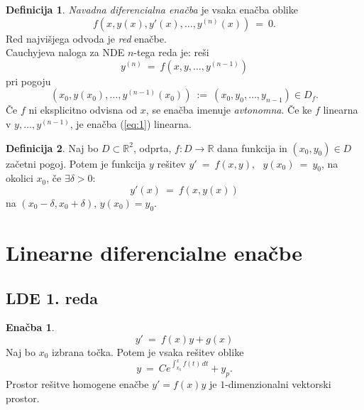 \documentclass[11pt]{article}
\newcommand{\R}{\mathbb{R}}
\newcommand{\0}{\mathbf{0}}
\theoremstyle{definition}
\newtheorem{definicija}{Definicija}[section]
\theoremstyle{definition}
\theoremstyle{definition}
\theoremstyle{definition}
\newtheorem{enacba}{Enačba}
\begin{document}
\begin{definicija}

\textit{Navadna diferencialna enačba} je vsaka enačba oblike
$$f(x,y(x),y'(x),\ldots,y^{(n)}(x)) ~=~ 0.$$
Red najvišjega odvoda je \textit{red} enačbe. \\

\noindent Cauchyjeva naloga za NDE $n$-tega reda je: reši
\begin{equation} \label{eq:1}
y^{(n)} ~=~ f(x,y,\ldots,y^{(n-1)})
\end{equation}
pri pogoju
$$(x_0,y(x_0),\ldots,y^{(n-1)}(x_0)) ~:=~ (x_0,y_0,\ldots,y_{n-1}) \in D_f.$$
Če $f$ ni eksplicitno odvisna od $x$, se enačba imenuje \textit{avtonomna}. Če ke $f$ linearna v $y,\ldots,y^{(n-1)}$, je enačba (\ref{eq:1}) linearna.

\end{definicija}
\vspace{0.5cm}

\begin{definicija}

Naj bo $D \subset \R^2$, odprta, $f: D \rightarrow \R$ dana funkcija in $(x_0,y_0) \in D$ začetni pogoj. Potem je funkcija $y$ rešitev
$y' ~=~ f(x,y), ~~~y(x_0) ~=~ y_0$,
na okolici $x_0$, če $\exists \delta > 0$:
$$y'(x) ~=~ f(x,y(x))$$
na $(x_0 - \delta, x_0 + \delta)$, $y(x_0) = y_0$.

\end{definicija}
\vspace{0.5cm}

\pagebreak


\section{Linearne diferencialne enačbe}
\vspace{0.5cm}


\subsection{LDE 1. reda}
\vspace{0.5cm}

\begin{enacba}

$$y' ~=~ f(x)y + g(x)$$
Naj bo $x_0$ izbrana točka. Potem je vsaka rešitev oblike
$$y ~=~ Ce^{\int_{x_0}^x f(t) \,dt} + y_p.$$
Prostor rešitve homogene enačbe $y' = f(x)y$ je $1$-dimenzionalni vektorski prostor.

\end{enacba}
\vspace{0.5cm}
\end{document}
